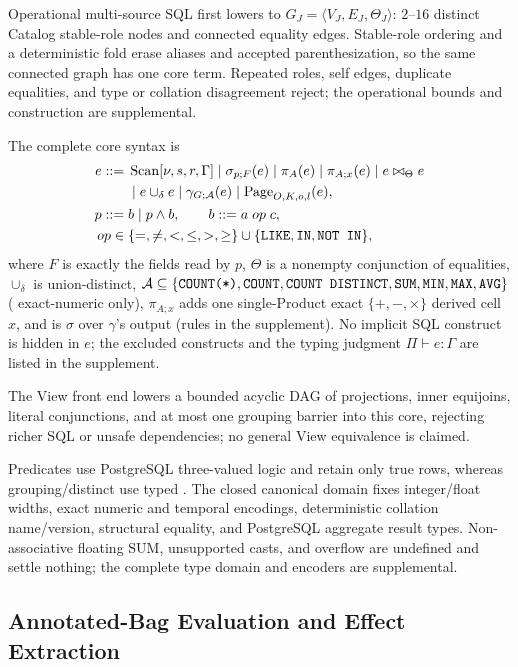 \documentclass[10pt,journal,compsoc]{IEEEtran}
\newcommand{\code}[1]{\texttt{\detokenize{#1}}}
\begin{document}
Operational multi-source SQL first lowers to
$G_J=\langle V_J,E_J,\Theta_J\rangle$: $2$--$16$ distinct Catalog stable-role
nodes and connected equality edges. Stable-role ordering and a deterministic
fold erase aliases and accepted parenthesization, so the same connected graph
has one core term. Repeated roles, self edges, duplicate equalities, and type or
collation disagreement reject; the operational bounds and construction are
supplemental.

The complete core syntax is
\begin{align*}
e ::= {}& \operatorname{Scan}[\nu,s,r,\Gamma]
 \mid \sigma_{p;F}(e) \mid \pi_A(e) \mid \pi_{A;x}(e) \mid e\bowtie_{\Theta}e \\
 &\mid e\cup_\delta e \mid \gamma_{G;\mathcal A}(e)
 \mid \operatorname{Page}_{O,K,o,l}(e),\\
p ::= {}& b \mid p\wedge b,\qquad b ::= a\;op\;c,\\
op\in {}&\{=,\ne,<,\le,>,\ge\}
 \cup\{\code{LIKE},\code{IN},\code{NOT IN}\},
\end{align*}
where $F$ is exactly the fields read by $p$, $\Theta$ is a nonempty
conjunction of equalities, $\cup_\delta$ is union-distinct,
$\mathcal A\subseteq\{\code{COUNT(*)},\code{COUNT},\code{COUNT DISTINCT},\code{SUM},\code{MIN},
\code{MAX},\code{AVG}\}$ (\code{AVG} exact-numeric only), $\pi_{A;x}$ adds one
single-Product exact $\{+,-,\times\}$ derived cell $x$, and \code{HAVING} is
$\sigma$ over $\gamma$'s output (rules in the supplement). No implicit SQL construct is hidden in $e$; the
excluded constructs and the typing judgment $\Pi\vdash e:\Gamma$ are
listed in the supplement.

The View front end lowers a bounded acyclic DAG of projections,
inner equijoins, literal conjunctions, and at most one grouping barrier into
this core, rejecting richer SQL or unsafe dependencies; no general View
equivalence is claimed.

Predicates use PostgreSQL three-valued logic and retain only true rows, whereas
grouping/distinct use typed \code{IS NOT DISTINCT FROM}. The closed canonical
domain fixes integer/float widths, exact numeric and temporal encodings,
deterministic collation name/version, \code{jsonb} structural equality, and
PostgreSQL aggregate result types. Non-associative
floating SUM, unsupported casts, and overflow are undefined and settle
nothing; the complete type domain and encoders are supplemental.

\subsection{Annotated-Bag Evaluation and Effect Extraction}
\label{sec:effect-extraction}
\end{document}

